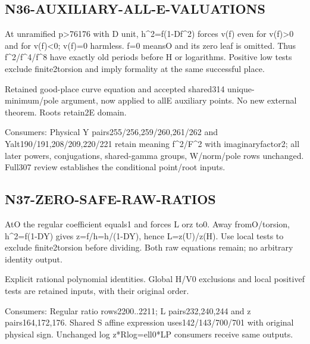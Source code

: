 \documentclass{article}
\begin{document}
\subsection{N36-AUXILIARY-ALL-E-VALUATIONS}
\label{outline:r5-n36-auxiliary-all-e-valuations}
At unramified p>76176 with D unit, h\textasciicircum{}2=f(1-Df\textasciicircum{}2) forces v(f) even for v(f)>0 and for v(f)<0; v(f)=0 harmless. f=0 meansO and its zero leaf is omitted. Thus f\textasciicircum{}2/f\textasciicircum{}4/f\textasciicircum{}8 have exactly old periods before H or logarithms. Positive low tests exclude finite2torsion and imply formality at the same successful place.
\par Retained good-place curve equation and accepted shared314 unique-minimum/pole argument, now applied to allE auxiliary points. No new external theorem. Roots retain2E domain.
\par Consumers: Physical Y pairs255/256,259/260,261/262 and Yalt190/191,208/209,220/221 retain meaning f\textasciicircum{}2/F\textasciicircum{}2 with imaginaryfactor2; all later powers, conjugations, shared-gamma groups, W/norm/pole rows unchanged. Full307 review establishes the conditional point/root inputs.
\subsection{N37-ZERO-SAFE-RAW-RATIOS}
\label{outline:r5-n37-zero-safe-raw-ratios}
AtO the regular coefficient equals1 and forces L orz to0. Away fromO/torsion, h\textasciicircum{}2=f(1-DY) gives z=f/h=h/(1-DY), hence L=z(U)/z(H). Use local tests to exclude finite2torsion before dividing. Both raw equations remain; no arbitrary identity output.
\par Explicit rational polynomial identities. Global H/V0 exclusions and local positivef tests are retained inputs, with their original order.
\par Consumers: Regular ratio rows2200..2211; L pairs232,240,244 and z pairs164,172,176. Shared S affine expression uses142/143/700/701 with original physical sign. Unchanged log z*Rlog=ell0*LP consumers receive same outputs.
\end{document}
